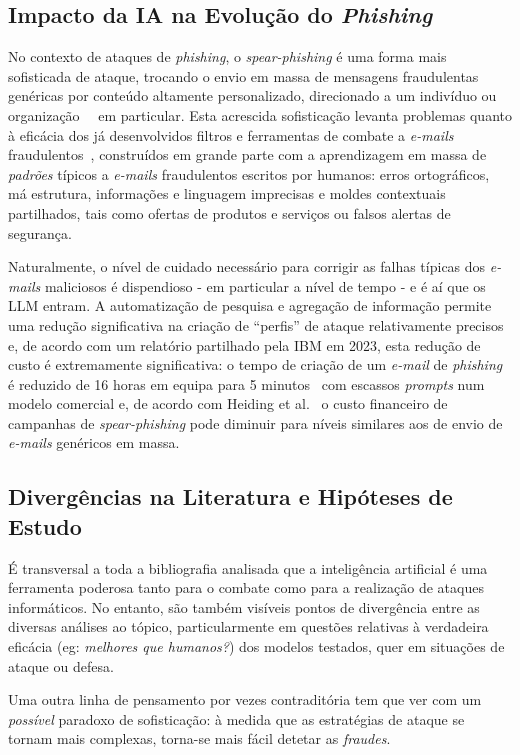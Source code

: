 \documentclass[pdflatex,sn-mathphys-num]{sn-jnl}
\theoremstyle{thmstyleone}%
\theoremstyle{thmstyletwo}%
\theoremstyle{thmstylethree}%
\begin{document}
\subsection{Impacto da IA na Evolução do \textit{Phishing}}\label{subsec2.3}
No contexto de ataques de \textit{phishing}, o \textit{spear-phishing} é uma forma mais sofisticada de ataque, trocando o envio em massa de mensagens fraudulentas genéricas por conteúdo altamente personalizado, direcionado a um indivíduo ou organização~\cite{bib3}~\cite{bib8} em particular.
Esta acrescida sofisticação levanta problemas quanto à eficácia dos já desenvolvidos filtros e ferramentas de combate a \textit{e-mails} fraudulentos~\cite{bib3}, construídos em grande parte com a aprendizagem em massa de \textit{padrões} típicos a \textit{e-mails} fraudulentos escritos por humanos: erros ortográficos, má estrutura, informações e linguagem imprecisas e moldes contextuais partilhados, tais como ofertas de produtos e serviços ou falsos alertas de segurança.

Naturalmente, o nível de cuidado necessário para corrigir as falhas típicas dos \textit{e-mails} maliciosos é dispendioso - em particular a nível de tempo - e é aí que os LLM entram. A automatização de pesquisa e agregação de informação permite uma redução significativa na criação de ``perfis'' de ataque relativamente precisos e, de acordo com um relatório partilhado pela IBM em 2023, esta redução de custo é extremamente significativa: o tempo de criação de um \textit{e-mail} de \textit{phishing} é reduzido de 16 horas em equipa para 5 minutos~\cite{bib9} com escassos \textit{prompts} num modelo comercial e, de acordo com Heiding et al.~\cite{bib2} o custo financeiro de campanhas de \textit{spear-phishing} pode diminuir para níveis similares aos de envio de \textit{e-mails} genéricos em massa.


\subsection{Divergências na Literatura e Hipóteses de Estudo}\label{subsec2.4}
É transversal a toda a bibliografia analisada que a inteligência artificial é uma ferramenta poderosa tanto para o combate como para a realização de ataques informáticos. No entanto, são também visíveis pontos de divergência entre as diversas análises ao tópico, particularmente em questões relativas à verdadeira eficácia (eg: \textit{melhores que humanos?}) dos modelos testados, quer em situações de ataque ou defesa.

Uma outra linha de pensamento por vezes contraditória tem que ver com um \textit{possível} paradoxo de sofisticação: à medida que as estratégias de ataque se tornam mais complexas, torna-se mais fácil detetar as \textit{fraudes}.
\end{document}
